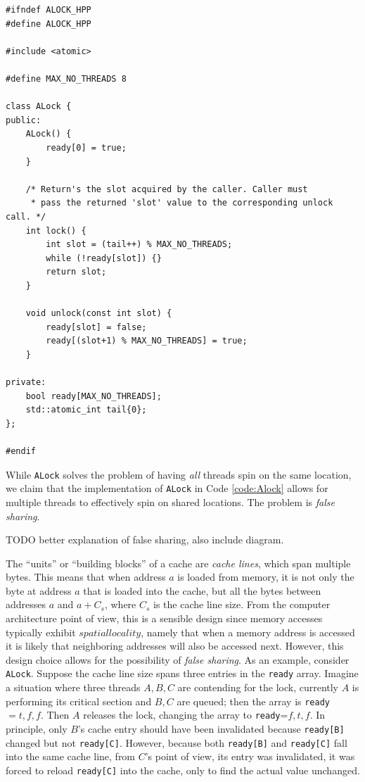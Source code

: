 \makebox[\linewidth]{\rule{17cm}{0.4pt}}
{\centering \label{code:Alock}
\begin{verbatim}
#ifndef ALOCK_HPP
#define ALOCK_HPP

#include <atomic>

#define MAX_NO_THREADS 8

class ALock {
public:
    ALock() {
        ready[0] = true;
    }

    /* Return's the slot acquired by the caller. Caller must
     * pass the returned 'slot' value to the corresponding unlock call. */
    int lock() {
        int slot = (tail++) % MAX_NO_THREADS;
        while (!ready[slot]) {}
        return slot;
    }

    void unlock(const int slot) {
        ready[slot] = false;
        ready[(slot+1) % MAX_NO_THREADS] = true;
    }

private:
    bool ready[MAX_NO_THREADS];
    std::atomic_int tail{0};
};

#endif
\end{verbatim}
\makebox[\linewidth]{\rule{17cm}{0.4pt}}
}

While \verb|ALock| solves the problem of having \textit{all} threads spin on the same location, we claim that the implementation of \verb|ALock| in Code \ref{code:Alock} allows for multiple threads to effectively spin on shared locations. The problem is \textit{false sharing}.

TODO better explanation of false sharing, also include diagram.
\begin{definition}
    The ``units'' or ``building blocks'' of a cache are \textit{cache lines}, which span multiple bytes. This means that when address $a$ is loaded from memory, it is not only the byte at address $a$ that is loaded into the cache, but all the bytes between addresses $a$ and $a+C_s$, where $C_s$ is the cache line size. From the computer architecture point of view, this is a sensible design since memory accesses typically exhibit $spatial locality$, namely that when a memory address is accessed it is likely that neighboring addresses will also be accessed next. However, this design choice allows for the possibility of \textit{false sharing}. As an example, consider \verb|ALock|. Suppose the cache line size spans three entries in the \verb|ready| array. Imagine a situation where three threads $A,B,C$ are contending for the lock, currently $A$ is performing its critical section and $B,C$ are queued; then the array is \verb|ready|$={t,f,f}$. Then $A$ releases the lock, changing the array to \verb|ready|=${f,t,f}$. In principle, only $B$'s cache entry should have been invalidated because \verb|ready[B]| changed but not \verb|ready[C]|. However, because both \verb|ready[B]| and \verb|ready[C]| fall into the same cache line, from $C$'s point of view, its entry was invalidated, it was forced to reload \verb|ready[C]| into the cache, only to find the actual value unchanged.
\end{definition}

